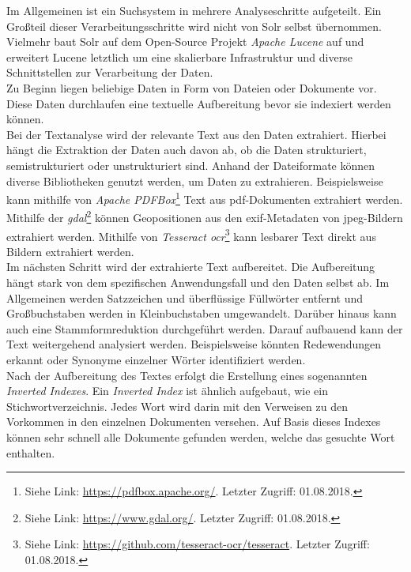 \noindent
Im Allgemeinen ist ein Suchsystem in mehrere Analyseschritte aufgeteilt. Ein Großteil dieser Verarbeitungsschritte wird nicht von Solr selbst übernommen. Vielmehr baut Solr auf dem Open-Source Projekt \textit{Apache Lucene\texttrademark\thinspace} auf und erweitert Lucene letztlich um eine skalierbare Infrastruktur und diverse Schnittstellen zur Verarbeitung der Daten.\\
Zu Beginn liegen beliebige Daten in Form von Dateien oder Dokumente vor. Diese Daten durchlaufen eine textuelle Aufbereitung bevor sie indexiert werden können.\\ 
Bei der Textanalyse wird der relevante Text aus den Daten extrahiert. Hierbei hängt die Extraktion der Daten auch davon ab, ob die Daten strukturiert, semistrukturiert oder unstrukturiert sind. Anhand der Dateiformate können diverse Bibliotheken genutzt werden, um Daten zu extrahieren. Beispielsweise kann mithilfe von \textit{Apache PDFBox\textsuperscript{\textregistered}}\footnote{Siehe Link: \url{https://pdfbox.apache.org/}. Letzter Zugriff: 01.08.2018.} Text aus \acrshort{pdf}-Dokumenten extrahiert werden. Mithilfe der \textit{\gls{gdal}}\footnote{Siehe Link: \url{https://www.gdal.org/}. Letzter Zugriff: 01.08.2018.} können Geopositionen aus den \acrshort{exif}-Metadaten von \acrshort{jpeg}-Bildern extrahiert werden. Mithilfe von \textit{Tesseract \acrshort{ocr}}\footnote{Siehe Link: \url{https://github.com/tesseract-ocr/tesseract}. Letzter Zugriff: 01.08.2018.} kann lesbarer Text direkt aus Bildern extrahiert werden.\cite[S. 39]{solr_search}\\

\noindent
Im nächsten Schritt wird der extrahierte Text aufbereitet. Die Aufbereitung hängt stark von dem spezifischen Anwendungsfall und den Daten selbst ab. Im Allgemeinen werden Satzzeichen und überflüssige Füllwörter entfernt und Großbuchstaben werden in Kleinbuchstaben umgewandelt. Darüber hinaus kann auch eine Stammformreduktion durchgeführt werden. Darauf aufbauend kann der Text weitergehend analysiert werden. Beispielsweise könnten Redewendungen erkannt oder Synonyme einzelner Wörter identifiziert werden.\cite[S.44]{solr_search}\\

\noindent
Nach der Aufbereitung des Textes erfolgt die Erstellung eines sogenannten \textit{Inverted Indexes}. Ein \textit{Inverted Index} ist ähnlich aufgebaut, wie ein Stichwortverzeichnis. Jedes Wort wird darin mit den Verweisen zu den Vorkommen in den einzelnen Dokumenten versehen. Auf Basis dieses Indexes können sehr schnell alle Dokumente gefunden werden, welche das gesuchte Wort enthalten.\cite[S. 47]{solr_search}\\


